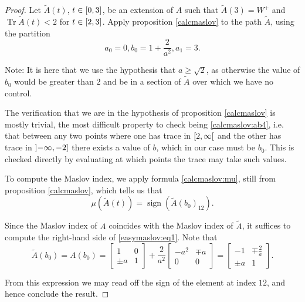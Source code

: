 \documentclass{article}
\theoremstyle{nonumberplain}
\newtheorem{proof}{Proof}
\DeclareMathOperator{\sign}{sign}
\DeclareMathOperator{\trace}{Tr}
\begin{document}
\begin{proof}
Let $\tilde A(t)$, $t \in \interval03$, be an extension of $A$ such that $\tilde A(3) = W^+$ and $\trace \tilde A(t) < 2$ for $t \in \interval23$. Apply proposition \ref{calcmaslov} to the path $\tilde A$, using the partition
\begin{equation}
a_0 = 0, b_0 = 1 + \frac2{a^2}, a_1 = 3.
\end{equation}

Note: It is here that we use the hypothesis that $a \geq \sqrt2$, as otherwise the value of $b_0$ would be greater than $2$ and be in a section of $\tilde A$ over which we have no control.

The verification that we are in the hypothesis of proposition \ref{calcmaslov} is mostly trivial, the most difficult property to check being \ref{calcmaslov:ab4}, i.e. that between any two points where one has trace in $\rinterval2\infty$ and the other has trace in $\linterval{-\infty}{-2}$ there exists a value of $b$, which in our case must be $b_0$. This is checked directly by evaluating at which points the trace may take such values.

To compute the Maslov index, we apply formula \eqref{calcmaslov:mu}, still from proposition \ref{calcmaslov}, which tells us that
\begin{equation}\label{easymaslov:eq1}
\mu(\tilde A(t)) = \sign(\tilde A(b_0)_{12}).
\end{equation}

Since the Maslov index of $A$ coincides with the Maslov index of $\tilde A$, it suffices to compute the right-hand side of \eqref{easymaslov:eq1}. Note that
\begin{equation}
\tilde A(b_0) = A(b_0) = 
\begin{bmatrix}
1 & 0\\
\pm a & 1
\end{bmatrix}
+
\frac2{a^2}
\begin{bmatrix}
- a^2 &  \mp a\\
0 & 0
\end{bmatrix}
=
\begin{bmatrix}
-1 & \mp \frac2a\\
\pm a & 1
\end{bmatrix}.
\end{equation}

From this expression we may read off the sign of the element at index $12$, and hence conclude the result.
\end{proof}
\end{document}

